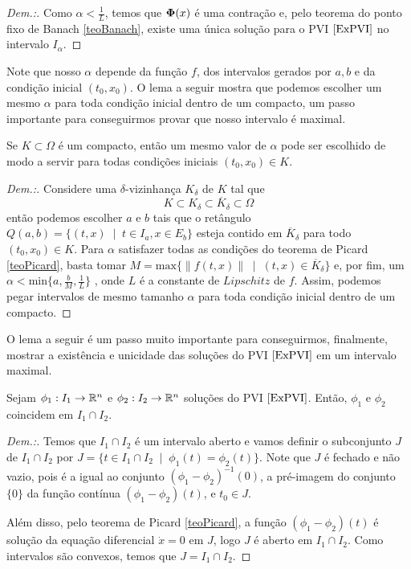 \begin{proof}[Dem.:]
    Como $\alpha<\frac{1}{L}$, temos que $\boldsymbol{\Phi}(x)$ é uma contração e, pelo teorema do ponto fixo de Banach \ref{teoBanach}, existe uma única solução para o PVI $\eqref{ExPVI}$ no intervalo $I_\alpha$.
\end{proof}

Note que nosso $\alpha$ depende da função $f$, dos intervalos gerados por $a,b$ e da condição inicial $(t_0,x_0)$. O lema a seguir mostra que podemos escolher um mesmo $\alpha$ para toda condição inicial dentro de um compacto, um passo importante para conseguirmos provar que nosso intervalo é maximal.

\begin{lemma}
    \label{lemmaAlphaCompacto}
    Se $K\subset\Omega$ é um compacto, então um mesmo valor de $\alpha$ pode ser escolhido de modo a servir para todas condições iniciais $(t_0,x_0)\in K$.
\end{lemma}
\begin{proof}[Dem.:] 
    Considere uma $\delta$-vizinhança $K_\delta$ de $K$ tal que
    \begin{equation}
        K\subset K_\delta\subset\overline{K}_\delta\subset\Omega
    \end{equation}
    então podemos escolher $a$ e $b$ tais que o retângulo $Q(a,b)=\{(t,x)\;\mid\;  t\in I_a, x\in E_b\}$ esteja contido em $\overline{K}_\delta$ para todo $(t_0,x_0)\in K$. Para $\alpha$ satisfazer todas as condições do teorema de Picard \ref{teoPicard}, basta tomar $M = \text{max}\{\|f(t,x)\|\;\mid\;  (t,x)\in\overline{K}_\delta\}$ e, por fim, um $\alpha<\text{min}\{a,\frac{b}{M},\frac{1}{L}\}$ , onde $L$ é a constante de $Lipschitz$ de $f$. Assim, podemos pegar intervalos de mesmo tamanho $\alpha$ para toda condição inicial dentro de um compacto.
\end{proof}

O lema a seguir é um passo muito importante para conseguirmos, finalmente, mostrar a existência e unicidade das soluções do PVI $\eqref{ExPVI}$ em um intervalo maximal.

\begin{lemma}
    \label{lemmaCoincidem}
    Sejam $\phi_1:I_1\to\mathbb{R}^n$ e $\phi_2:I_2\to\mathbb{R}^n$ soluções do PVI $\eqref{ExPVI}$. Então, $\phi_1$ e $\phi_2$ coincidem em $I_1\cap I_2$.
\end{lemma}
\begin{proof}[Dem.:]
    Temos que $I_1\cap I_2$ é um intervalo aberto e vamos definir o subconjunto $J$ de $I_1\cap I_2$ por $J=\{t\in I_1\cap I_2\;\mid\;  \phi_1(t)=\phi_2(t)\}$. Note que $J$ é fechado e não vazio, pois é a igual ao conjunto $(\phi_1-\phi_2)^{-1}(0)$, a pré-imagem do conjunto $\{0\}$ da função contínua $(\phi_1-\phi_2)(t)$, e $t_0\in J$.
    
    Além disso, pelo teorema de Picard \ref{teoPicard}, a função $(\phi_1-\phi_2)(t)$ é solução da equação diferencial $\dot{x}=0$ em $J$, logo $J$ é aberto em $I_1\cap I_2$. Como intervalos são convexos, temos que $J=I_1\cap I_2$.
\end{proof}

